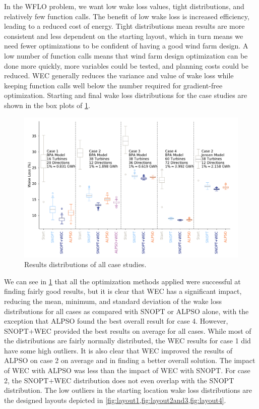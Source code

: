 \documentclass{jpconf}
\begin{document}
In the WFLO problem, we  want low wake loss values, tight distributions, and relatively few function calls. The benefit of low wake loss is increased efficiency, leading to a reduced cost of energy. Tight distributions mean results are more consistent and less dependent on the starting layout, which in turn means we need fewer optimizations to be confident of having a good wind farm design. A low number of function calls means that wind farm design optimization can be done more quickly, more variables could be tested, and planning costs could be reduced. WEC generally reduces the variance and value of wake loss while keeping function calls well below the number required for gradient-free optimization. Starting and final wake loss distributions for the case studies are shown in the box plots of \cref{fig:boxplots}. 
%
\begin{figure}[h!]
	\centering
	\begin{minipage}[t]{\textwidth}
		\centering
		\includegraphics[width=\textwidth]{final_images/results/dist_boxpercentwakeloss.pdf}  
		\caption{Results distributions of all case studies.}
		\label{fig:boxplots}
	\end{minipage} 
\end{figure}

We can see in \cref{fig:boxplots} that all the optimization methods applied were successful at finding fairly good results, but it is clear that WEC has a significant impact, reducing the mean, minimum, and standard deviation of the wake loss distributions for all cases as compared with SNOPT or ALPSO alone, with the exception that ALPSO found the best overall result for case 4. However, SNOPT+WEC  provided the best results on average for all cases. While most of the distributions are fairly normally distributed, the WEC results for case 1 did have some high outliers. It is also clear that WEC improved the results of ALPSO on case 2 on average and in finding a better overall solution. The impact of WEC with ALPSO was less than the impact of WEC with SNOPT. For case 2, the SNOPT+WEC distribution does not even overlap with the SNOPT distribution. The low outliers in the starting location wake loss distributions are the designed layouts depicted in \cref{fig:layout1,fig:layout2and3,fig:layout4}.
\end{document}
